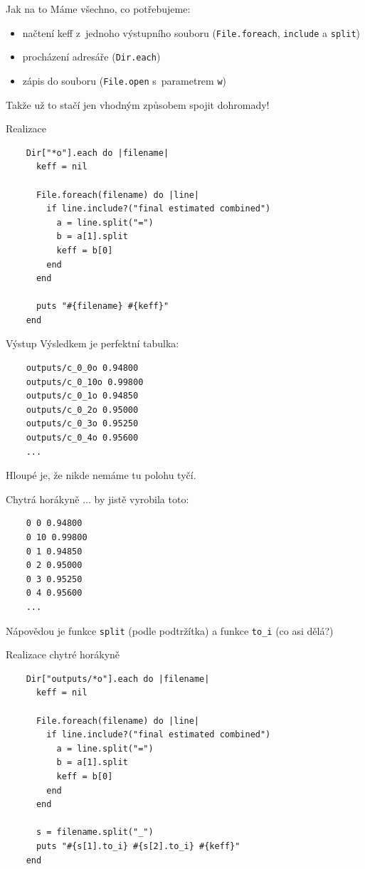 \documentclass{beamer}
\begin{document}
\begin{frame}{Jak na to}
  Máme všechno, co potřebujeme:
  \begin{itemize}
    \item načtení keff z~jednoho výstupního souboru (\texttt{File.foreach}, \texttt{include} a \texttt{split})
    \item procházení adresáře (\texttt{Dir.each})
    \item zápis do souboru (\texttt{File.open} s~parametrem \texttt{w})
  \end{itemize}
  Takže už to stačí jen vhodným způsobem spojit dohromady!
\end{frame}

\begin{frame}[fragile]{Realizace}
  \scriptsize
  \begin{verbatim}
    Dir["*o"].each do |filename|
      keff = nil

      File.foreach(filename) do |line|
        if line.include?("final estimated combined")
          a = line.split("=")
          b = a[1].split
          keff = b[0]
        end
      end

      puts "#{filename} #{keff}"
    end
  \end{verbatim}
\end{frame}

\begin{frame}[fragile]{Výstup}
  Výsledkem je perfektní tabulka:
  {\scriptsize
  \begin{verbatim}
    outputs/c_0_0o 0.94800
    outputs/c_0_10o 0.99800
    outputs/c_0_1o 0.94850
    outputs/c_0_2o 0.95000
    outputs/c_0_3o 0.95250
    outputs/c_0_4o 0.95600
    ...
  \end{verbatim}}
  Hloupé je, že nikde nemáme tu polohu tyčí.
\end{frame}


\begin{frame}[fragile]{Chytrá horákyně}
  ... by jistě vyrobila toto:
  {\scriptsize
  \begin{verbatim}
    0 0 0.94800
    0 10 0.99800
    0 1 0.94850
    0 2 0.95000
    0 3 0.95250
    0 4 0.95600
    ...
  \end{verbatim}
  }
  Nápovědou je funkce \texttt{split} (podle podtržítka) a funkce \texttt{to\_i} (co asi dělá?)
\end{frame}

\begin{frame}[fragile]{Realizace chytré horákyně}
  \scriptsize
  \begin{verbatim}
    Dir["outputs/*o"].each do |filename|
      keff = nil

      File.foreach(filename) do |line|
        if line.include?("final estimated combined")
          a = line.split("=")
          b = a[1].split
          keff = b[0]
        end
      end

      s = filename.split("_")
      puts "#{s[1].to_i} #{s[2].to_i} #{keff}"
    end
  \end{verbatim}
\end{frame}
\end{document}
